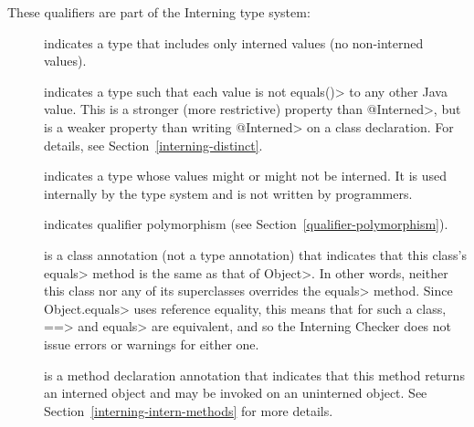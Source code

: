 
These qualifiers are part of the Interning type system:

\begin{description}

\item[]
  indicates a type that includes only interned values (no non-interned
  values).

\item[]
  indicates a type such that each value is not \<equals()> to any other
  Java value.  This is a stronger (more restrictive) property than
  \<@Interned>, but is a weaker property than writing \<@Interned> on a
  class declaration.  For
  details, see Section~\ref{interning-distinct}.

\item[]
  indicates a type whose values might or might not be interned.
  It is used internally by the type system and is not written by programmers.

\item[]
  indicates qualifier polymorphism (see
  Section~\ref{qualifier-polymorphism}).

\end{description}


\begin{description}

\item[]
  is a class annotation (not a type annotation) that indicates that this class's
  \<equals> method is the same as that of \<Object>.  In other words,
  neither this class nor any of its superclasses overrides the \<equals>
  method.  Since \<Object.equals> uses reference equality, this means that
  for such a class, \<==> and \<equals> are equivalent, and so the
  Interning Checker does not issue errors or warnings for either one.

\item[]
  is a method declaration annotation that indicates that this method
  returns an interned object and may be invoked
  on an uninterned object. See Section~\ref{interning-intern-methods} for more details.
\end{description}

